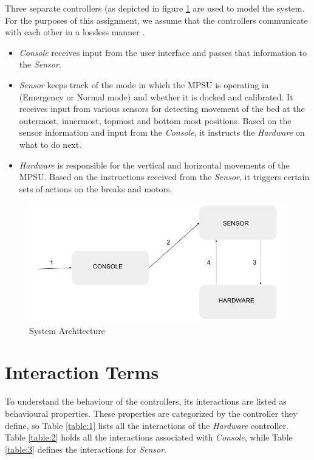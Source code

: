 \documentclass{article}
\begin{document}
Three separate controllers (as depicted in figure \ref{fig:sysarch} are used to model the system. For the purposes of this assignment, we assume that the controllers communicate with each other in a lossless manner \cite{ponse}.

\begin{itemize}
    \item [\textbullet] \textit{Console} receives input from the user interface and passes that information to the \textit{Sensor}. 
    \item [\textbullet] \textit{Sensor} keeps track of the mode in which the MPSU is operating in (Emergency or Normal mode) and whether it is docked and calibrated.
    It receives input from various sensors for detecting movement of the bed at the outermost, innermost, topmost and bottom most positions. Based on the sensor information and input from the \textit{Console}, it instructs the \textit{Hardware} on what to do next.
    \item [\textbullet] \textit{Hardware} is responsible for the vertical and horizontal movements of the MPSU. Based on the instructions received from the \textit{Sensor}, it triggers certain sets of actions on the breaks and motors.
\end{itemize}
 
\begin{figure}[h]
\centering
\includegraphics[width=\textwidth]{images/system-architecture.png}
\caption{System Architecture}
\label{fig:sysarch}
\end{figure}

\newpage
\section{Interaction Terms}
To understand the behaviour of the controllers, its interactions are listed as behavioural properties. These properties are categorized by the controller they define, so Table \ref{table:1} lists all the interactions of the \textit{Hardware} controller. Table \ref{table:2} holds all the interactions associated with \textit{Console}, while Table \ref{table:3} defines the interactions for \textit{Sensor}.
\end{document}
